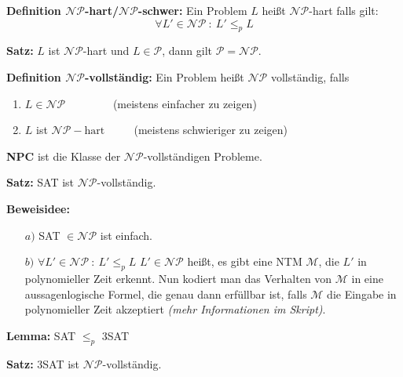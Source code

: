 \documentclass{scrartcl}%
\begin{document}
    \vspace*{0.3cm}
    \textbf{\textsf{Definition $\mathcal{N}\mathcal{P}$-hart/$\mathcal{N}\mathcal{P}$-schwer:}} Ein Problem $L$ heißt $\mathcal{N}\mathcal{P}$-hart falls gilt:
    \begin{equation*}
       \forall L' \in \mathcal{N}\mathcal{P} \ :\ L' \leq_p L
    \end{equation*}

    \vspace*{0.3cm}
    \textbf{\textsf{Satz:}} $L$ ist $\mathcal{N}\mathcal{P}$-hart und $L \in \mathcal{P}$, dann gilt $\mathcal{P} = \mathcal{N}\mathcal{P}$.

    \vspace*{0.3cm}
    \textbf{\textsf{Definition $\mathcal{N}\mathcal{P}$-vollständig:}}
    Ein Problem heißt $\mathcal{N}\mathcal{P}$ vollständig, falls
    \begin{enumerate}
        \item $L \in \mathcal{N}\mathcal{P} \qquad\qquad$ (meistens einfacher zu zeigen)
        \item $L$ ist $ \mathcal{N}\mathcal{P}-\text{hart } \qquad$ (meistens schwieriger zu zeigen)
    \end{enumerate}

    \textbf{\textsf{NPC}} ist die Klasse der $\mathcal{N}\mathcal{P}$-vollständigen Probleme.

    \vspace*{0.6cm}
    \textbf{\textsf{Satz:}} SAT ist $\mathcal{N}\mathcal{P}$-vollständig.

    \vspace*{0.3cm}
    \textbf{\textsf{Beweisidee:}}
    \begin{itemize}
        \item [$a)$] SAT $\in \mathcal{N}\mathcal{P}$ ist einfach.
        \item [$b)$] { $\forall L' \in \mathcal{N}\mathcal{P} \ :\ L' \leq_p L$ \newline
        $L' \in \mathcal{N}\mathcal{P}$ heißt, es gibt eine NTM $\mathcal{M}$, die $L'$ in polynomieller Zeit erkennt.
        Nun kodiert man das Verhalten von $\mathcal{M}$ in eine aussagenlogische Formel, die genau dann erfüllbar ist, falls $\mathcal{M}$ die Eingabe in polynomieller Zeit akzeptiert \textit{(mehr Informationen im Skript)}.
        }
    \end{itemize}

    \vspace*{0.3cm}
    \textbf{\textsf{Lemma:}} SAT $\leq_p$ 3SAT

    \vspace*{0.3cm}
    \textbf{\textsf{Satz:}} 3SAT ist $\mathcal{N}\mathcal{P}$-vollständig.
\end{document}
